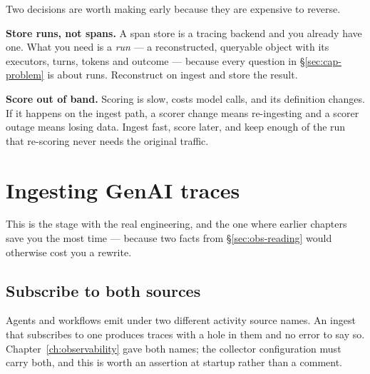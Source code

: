 \noindent
Two decisions are worth making early because they are expensive to reverse.

\textbf{Store runs, not spans.} A span store is a tracing backend and you already
have one. What you need is a \emph{run} --- a reconstructed, queryable object with
its executors, turns, tokens and outcome --- because every question in
\S\ref{sec:cap-problem} is about runs. Reconstruct on ingest and store the
result.

\textbf{Score out of band.} Scoring is slow, costs model calls, and its
definition changes. If it happens on the ingest path, a scorer change means
re-ingesting and a scorer outage means losing data. Ingest fast, score later,
and keep enough of the run that re-scoring never needs the original traffic.


\section{Ingesting GenAI traces}
\label{sec:cap-ingest}

This is the stage with the real engineering, and the one where earlier chapters
save you the most time --- because two facts from \S\ref{sec:obs-reading} would
otherwise cost you a rewrite.

\subsection{Subscribe to both sources}

Agents and workflows emit under two different activity source names. An ingest
that subscribes to one produces traces with a hole in them and no error to say
so. Chapter~\ref{ch:observability} gave both names; the collector configuration
must carry both, and this is worth an assertion at startup rather than a comment.

